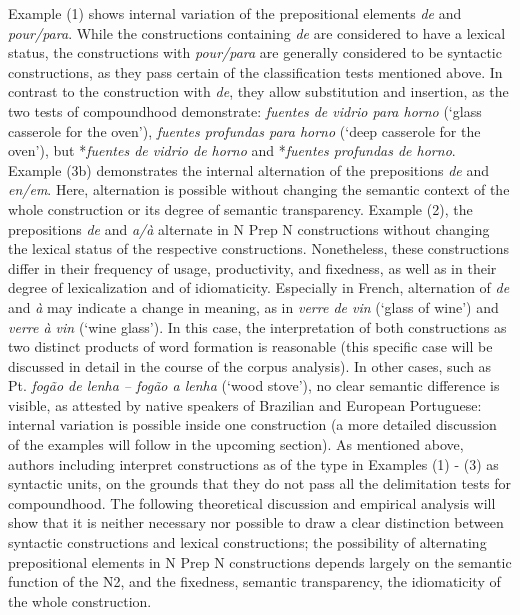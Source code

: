 \documentclass[output=paper]{langsci/langscibook}
\begin{document}
Example (1) shows internal variation of the prepositional elements \textit{de} and \textit{pour/para}. While the constructions containing \textit{de} are considered to have a lexical status, the constructions with \textit{pour/para} are generally considered to be syntactic constructions, as they pass certain of the classification tests mentioned above. In contrast to the construction with \textit{de}, they allow substitution and insertion, as the two tests of compoundhood demonstrate: \textit{fuentes de vidrio para horno} (`glass casserole for the oven'), \textit{fuentes profundas para horno} (`deep casserole for the oven'), but *\textit{fuentes de vidrio de horno} and *\textit{fuentes profundas de horno}. Example (3b) demonstrates the internal alternation of the prepositions \textit{de} and \textit{en/em}. Here, alternation is possible without changing the semantic context of the whole construction or its degree of semantic transparency. Example (2), the prepositions \textit{de} and \textit{a/à} alternate in N Prep N constructions without changing the lexical status of the respective constructions. Nonetheless, these constructions differ in their frequency of usage, productivity, and fixedness, as well as in their degree of lexicalization and of idiomaticity. Especially in French, alternation of \textit{de} and \textit{à} may indicate a change in meaning, as in \textit{verre de vin} (`glass of wine') and \textit{verre à vin} (`wine glass'). In this case, the interpretation of both constructions as two distinct products of word formation is reasonable (this specific case will be discussed in detail in the course of the corpus analysis). In other cases, such as Pt. \textit{fogão de lenha – fogão a lenha} (`wood stove'), no clear semantic difference is visible, as attested by native speakers of Brazilian and European Portuguese: internal variation is possible inside one construction (a more detailed discussion of the examples will follow in the upcoming section). As mentioned above, authors including \citet{RioTorto:2009} interpret constructions as of the type in Examples (1) - (3) as syntactic units, on the grounds that they do not pass all the delimitation tests for compoundhood. The following theoretical discussion and empirical analysis will show that it is neither necessary nor possible to draw a clear distinction between syntactic constructions and lexical constructions; the possibility of alternating prepositional elements in N Prep N constructions depends largely on the semantic function of the N2, and the fixedness, semantic transparency, the idiomaticity of the whole construction.\\
  
\end{document}
